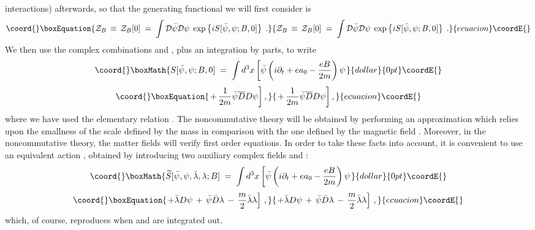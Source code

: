 \documentclass[a4paper,12pt]{article}
\begin{document}
interactions) afterwards, so that the generating functional we will
first consider is
\begin{equation}\coord{}\boxEquation{ 
{\mathcal Z}_B\,\equiv\,{\mathcal Z}_B[0]\;=\; \int{\mathcal D}{\bar\psi}{\mathcal D}\psi \;
\exp \left \{ i S[{\bar \psi},\psi;B,0] \right\}\;.
}{ 
{\mathcal Z}_B\,\equiv\,{\mathcal Z}_B[0]\;=\; \int{\mathcal D}{\bar\psi}{\mathcal D}\psi \;
\exp \left \{ i S[{\bar \psi},\psi;B,0] \right\}\;.
}{ecuacion}\coordE{}\end{equation}
We then use the complex combinations \coordHE{} and 
\coordHE{}, plus an integration by parts, to write
$$\coord{}\boxMath{
S[{\bar \psi},\psi;B,0]\;=\;\int d^3x \left[ {\bar\psi} \left(i \partial_t + e a_0 - 
\frac{ e B}{2 m }\right)\psi \right.
}{dollar}{0pt}\coordE{}$$
\begin{equation}\coord{}\boxEquation{
\left. + \,\frac{1}{2m} {\bar\psi} {\overline D} D \psi \right],
}{
\left. + \,\frac{1}{2m} {\bar\psi} {\overline D} D \psi \right],
}{ecuacion}\coordE{}\end{equation}
where we have used the elementary relation 
\coordHE{}.
The noncommutative theory will be obtained by performing an 
approximation which relies upon the smallness of the scale defined 
by the mass in comparison with the one defined by the magnetic 
field \coordHE{}. Moreover, in the noncommutative theory, the matter 
fields will verify first order equations. In order to take 
these facts into account, it is convenient to use an equivalent 
action  \coordHE{}, obtained by introducing two auxiliary 
complex fields \myHighlight{$\lambda$}\coordHE{} and \myHighlight{${\bar\lambda}$}\coordHE{}:
$$\coord{}\boxMath{
{\widetilde S}[{\bar \psi},\psi,{\bar \lambda},\lambda;B]\;=\;\int d^3x \left[ 
{\bar\psi} \left(i  \partial_t + e a_0 - \frac{ e B}{2 m }\right)\psi \right.
}{dollar}{0pt}\coordE{}$$
\begin{equation}\coord{}\boxEquation{
 \label{eq:hst}
\left. + {\bar\lambda}D \psi \,+\,  {\bar\psi}{\bar D} \lambda \,-\,
\frac{m}{2}{\bar\lambda}\lambda \right]\,,
}{
 \left. + {\bar\lambda}D \psi \,+\,  {\bar\psi}{\bar D} \lambda \,-\,
\frac{m}{2}{\bar\lambda}\lambda \right]\,,
}{ecuacion}\coordE{}\end{equation}
which, of course, reproduces \coordHE{} when \myHighlight{${\bar\lambda}$}\coordHE{} and \myHighlight{$\lambda$}\coordHE{} are 
integrated out.
\end{document}
